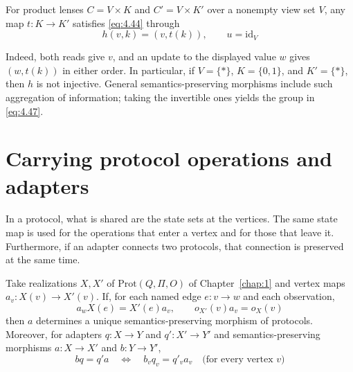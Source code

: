 \begin{example}\label{ex:4.39}

For product lenses $C=V\times K$ and $C'=V\times K'$ over a nonempty view set $V$,
any map $t:K\to K'$ satisfies \eqref{eq:4.44} through
\begin{equation*}
h(v,k)=(v,t(k)),\qquad u=\mathrm{id}_V
\tag{4.48}\label{eq:4.48}
\end{equation*}

Indeed, both reads give $v$, and an update to the displayed value $w$ gives
$(w,t(k))$ in either order.
In particular, if $V=\{*\}$, $K=\{0,1\}$, and $K'=\{*\}$, then $h$ is not injective.
General semantics-preserving morphisms include such aggregation of information;
taking the invertible ones yields the group in \eqref{eq:4.47}.

\end{example}

\section{Carrying protocol operations and adapters}\label{sec:4.11}

In a protocol, what is shared are the state sets at the vertices.
The same state map is used for the operations that enter a vertex and for those that
leave it.
Furthermore, if an adapter connects two protocols, that connection is preserved at the
same time.

\begin{proposition}\label{prop:4.40}

Take realizations $X,X'$ of $\mathrm{Prot}(Q,\Pi,O)$ of Chapter~\ref{chap:1} and vertex
maps $a_v:X(v)\to X'(v)$.
If, for each named edge $e:v\to w$ and each observation,
\begin{equation*}
a_wX(e)=X'(e)a_v,\qquad
o_{X'}(v)a_v=o_X(v)
\tag{4.49}\label{eq:4.49}
\end{equation*}
then $a$ determines a unique semantics-preserving morphism of protocols.
Moreover, for adapters $q:X\to Y$ and $q':X'\to Y'$ and semantics-preserving morphisms
$a:X\to X'$ and $b:Y\to Y'$,
\begin{equation*}
bq=q'a
\quad\Longleftrightarrow\quad
b_vq_v=q'_va_v\quad\text{(for every vertex }v\text{)}
\tag{4.50}\label{eq:4.50}
\end{equation*}
\end{proposition}

